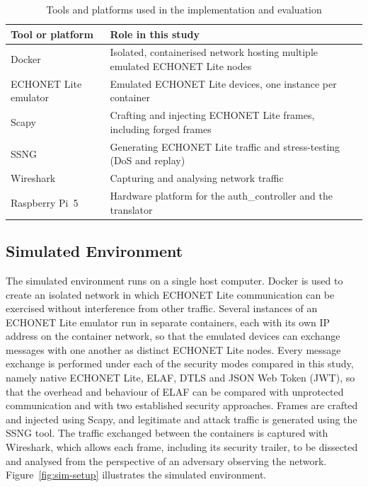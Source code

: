 \begin{table}[htbp]
  \centering
  \caption{Tools and platforms used in the implementation and evaluation}
  \label{tab:tools}
  \renewcommand{\arraystretch}{1.2}
  \begin{tabularx}{\textwidth}{@{}l X@{}}
    \toprule
    \textbf{Tool or platform} & \textbf{Role in this study}                                                 \\
    \midrule
    Docker                    & Isolated, containerised network hosting multiple emulated ECHONET Lite nodes \\
    ECHONET Lite emulator     & Emulated ECHONET Lite devices, one instance per container                  \\
    Scapy                     & Crafting and injecting ECHONET Lite frames, including forged frames        \\
    SSNG                      & Generating ECHONET Lite traffic and stress-testing (DoS and replay)         \\
    Wireshark                 & Capturing and analysing network traffic                                    \\
    Raspberry Pi~5            & Hardware platform for the auth\_controller and the translator              \\
    \bottomrule
  \end{tabularx}
\end{table}

\subsection{Simulated Environment}
\label{sec:m-simulation}

The simulated environment runs on a single host computer. Docker is used to create an isolated network in which ECHONET Lite communication can be exercised without interference from other traffic. Several instances of an ECHONET Lite emulator run in separate containers, each with its own IP address on the container network, so that the emulated devices can exchange messages with one another as distinct ECHONET Lite nodes. Every message exchange is performed under each of the security modes compared in this study, namely native ECHONET Lite, ELAF, DTLS and JSON Web Token (JWT), so that the overhead and behaviour of ELAF can be compared with unprotected communication and with two established security approaches. Frames are crafted and injected using Scapy, and legitimate and attack traffic is generated using the SSNG tool. The traffic exchanged between the containers is captured with Wireshark, which allows each frame, including its security trailer, to be dissected and analysed from the perspective of an adversary observing the network. Figure~\ref{fig:sim-setup} illustrates the simulated environment.

